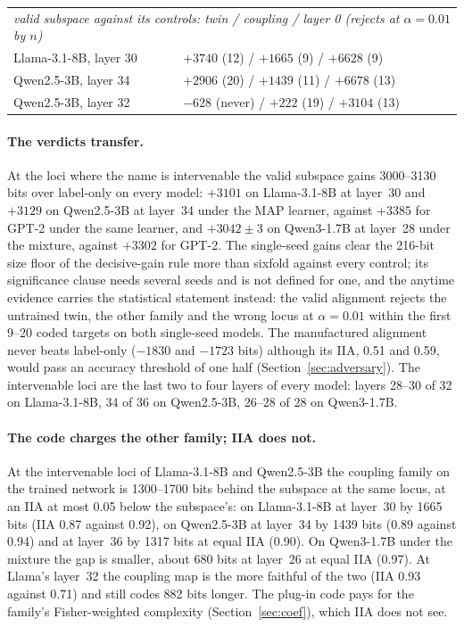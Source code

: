 \documentclass[11pt,a4paper]{article}
\begin{document}
\begin{table}[htbp]
{\begin{tabular}{lllll}
\midrule
\multicolumn{5}{l}{\emph{valid subspace against its controls: twin / coupling / layer 0 (rejects at $\alpha=0.01$ by $n$)}}\\
Llama-3.1-8B, layer 30 & \multicolumn{4}{l}{$+3740$ (12) / $+1665$ (9) / $+6628$ (9)}\\
Qwen2.5-3B, layer 34 & \multicolumn{4}{l}{$+2906$ (20) / $+1439$ (11) / $+6678$ (13)}\\
Qwen2.5-3B, layer 32 & \multicolumn{4}{l}{$-628$ (never) / $+222$ (19) / $+3104$ (13)}\\
\bottomrule
\end{tabular}}
\end{table}

\paragraph{The verdicts transfer.} At the loci where the name is intervenable the valid subspace gains 3000--3130 bits over label-only on every model: $+3101$ on Llama-3.1-8B at layer~30 and $+3129$ on Qwen2.5-3B at layer~34 under the MAP learner, against $+3385$ for GPT-2 under the same learner, and $+3042\pm3$ on Qwen3-1.7B at layer~28 under the mixture, against $+3302$ for GPT-2. The single-seed gains clear the 216-bit size floor of the decisive-gain rule more than sixfold against every control; its significance clause needs several seeds and is not defined for one, and the anytime evidence carries the statistical statement instead: the valid alignment rejects the untrained twin, the other family and the wrong locus at $\alpha=0.01$ within the first 9--20 coded targets on both single-seed models. The manufactured alignment never beats label-only ($-1830$ and $-1723$ bits) although its IIA, 0.51 and 0.59, would pass an accuracy threshold of one half (Section~\ref{sec:adversary}). The intervenable loci are the last two to four layers of every model: layers 28--30 of 32 on Llama-3.1-8B, 34 of 36 on Qwen2.5-3B, 26--28 of 28 on Qwen3-1.7B.

\paragraph{The code charges the other family; IIA does not.} At the intervenable loci of Llama-3.1-8B and Qwen2.5-3B the coupling family on the trained network is 1300--1700 bits behind the subspace at the same locus, at an IIA at most 0.05 below the subspace's: on Llama-3.1-8B at layer~30 by 1665 bits (IIA 0.87 against 0.92), on Qwen2.5-3B at layer~34 by 1439 bits (0.89 against 0.94) and at layer~36 by 1317 bits at equal IIA (0.90). On Qwen3-1.7B under the mixture the gap is smaller, about 680 bits at layer~26 at equal IIA (0.97). At Llama's layer~32 the coupling map is the more faithful of the two (IIA 0.93 against 0.71) and still codes 882 bits longer. The plug-in code pays for the family's Fisher-weighted complexity (Section~\ref{sec:coef}), which IIA does not see.
\end{document}
